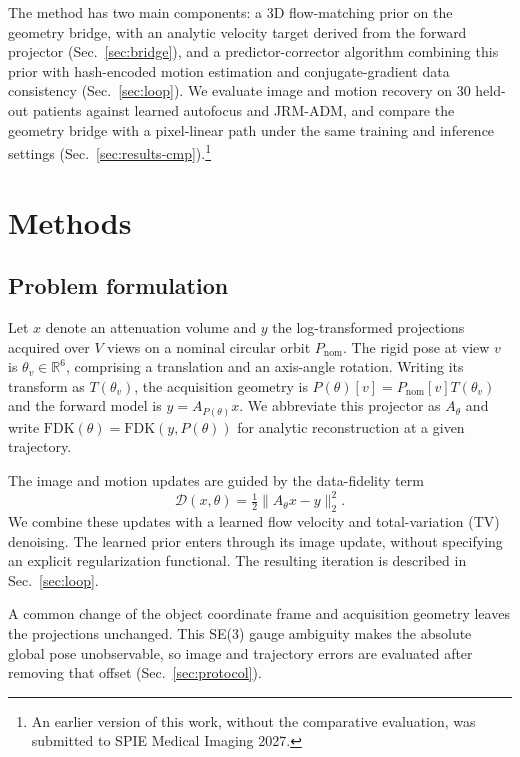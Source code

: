 \documentclass[11pt]{article}
\newcommand{\FDK}{\mathrm{FDK}}
\newcommand{\Pnom}{P_{\mathrm{nom}}}
\begin{document}
The method has two main components: a 3D flow-matching prior on the geometry bridge,
with an analytic velocity target derived from the forward projector
(Sec.~\ref{sec:bridge}), and a predictor-corrector algorithm combining this prior with
hash-encoded motion estimation and conjugate-gradient data consistency
(Sec.~\ref{sec:loop}). We evaluate image and motion recovery on 30 held-out patients
against learned autofocus and JRM-ADM, and compare the geometry bridge with a
pixel-linear path under the same training and inference settings
(Sec.~\ref{sec:results-cmp}).\footnote{An earlier version of this work, without the
comparative evaluation, was submitted to SPIE Medical Imaging 2027.}

\section{Methods}
\label{sec:method}

\subsection{Problem formulation}
\label{sec:forward}

Let $x$ denote an attenuation volume and $y$ the log-transformed projections acquired
over $V$ views on a nominal circular orbit $\Pnom$. The rigid pose at view $v$ is
$\theta_v\in\mathbb{R}^6$, comprising a translation and an axis-angle rotation.
Writing its transform as $T(\theta_v)$, the acquisition geometry is
$P(\theta)[v]=\Pnom[v]T(\theta_v)$ and the forward model is
$y=A_{P(\theta)}x$. We abbreviate this projector as $A_\theta$ and write
$\FDK(\theta)=\FDK(y,P(\theta))$ for analytic reconstruction at a given trajectory.

The image and motion updates are guided by the data-fidelity term
\begin{equation}
\mathcal{D}(x,\theta)=\tfrac12\|A_\theta x-y\|_2^2.
\label{eq:objective}
\end{equation}
We combine these updates with a learned flow velocity and total-variation (TV)
denoising. The learned prior enters through its image update, without specifying an
explicit regularization functional. The resulting iteration is described in
Sec.~\ref{sec:loop}.

A common change of the object coordinate frame and acquisition geometry leaves the
projections unchanged. This SE(3) gauge ambiguity makes the absolute global pose
unobservable, so image and trajectory errors are evaluated after removing that offset
(Sec.~\ref{sec:protocol}).
\end{document}
